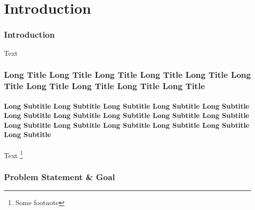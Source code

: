 \section{Introduction}
\label{sec:intro}


\begin{frame}
\frametitle{Introduction}
	Text
\end{frame}


\begin{frame}
\frametitle{Long Title Long Title Long Title Long Title Long Title Long Title Long Title Long Title Long Title Long Title}
\framesubtitle{Long Subtitle Long Subtitle Long Subtitle Long Subtitle Long Subtitle Long Subtitle Long Subtitle Long Subtitle Long Subtitle Long Subtitle Long Subtitle Long Subtitle Long Subtitle Long Subtitle Long Subtitle Long Subtitle}
	Text
	\footnote[frame]{Some footnote}
\end{frame}









\begin{frame}
\frametitle{Problem Statement \& Goal}
	
\end{frame}










